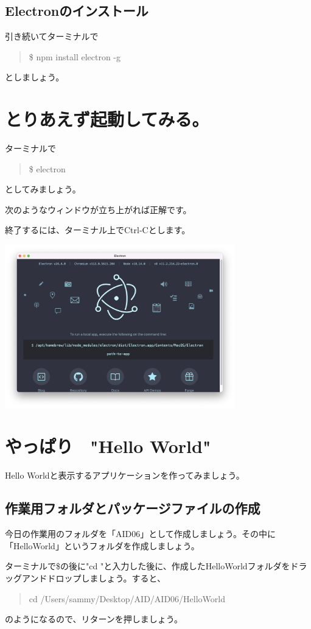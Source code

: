 \documentclass[mingoth,11pt,a4j,uplatex]{jsarticle}
\begin{document}
\subsection{Electronのインストール}
引き続いてターミナルで
\begin{quote}
\$ npm install electron -g
\end{quote}
としましょう。


\section{とりあえず起動してみる。}
ターミナルで
\begin{quote}
\$ electron
\end{quote}
としてみましょう。

次のようなウィンドウが立ち上がれば正解です。

終了するには、ターミナル上でCtrl-Cとします。

\includegraphics[width=10cm]{img/electron_default.png}

\section{やっぱり　"Hello World"}
Hello Worldと表示するアプリケーションを作ってみましょう。

\subsection{作業用フォルダとパッケージファイルの作成}
今日の作業用のフォルダを「AID06」として作成しましょう。その中に「HelloWorld」というフォルダを作成しましょう。

ターミナルで\$の後に"cd "と入力した後に、作成したHelloWorldフォルダをドラッグアンドドロップしましょう。すると、
\begin{quote}
cd /Users/sammy/Desktop/AID/AID06/HelloWorld 
\end{quote}
のようになるので、リターンを押しましょう。
\end{document}
